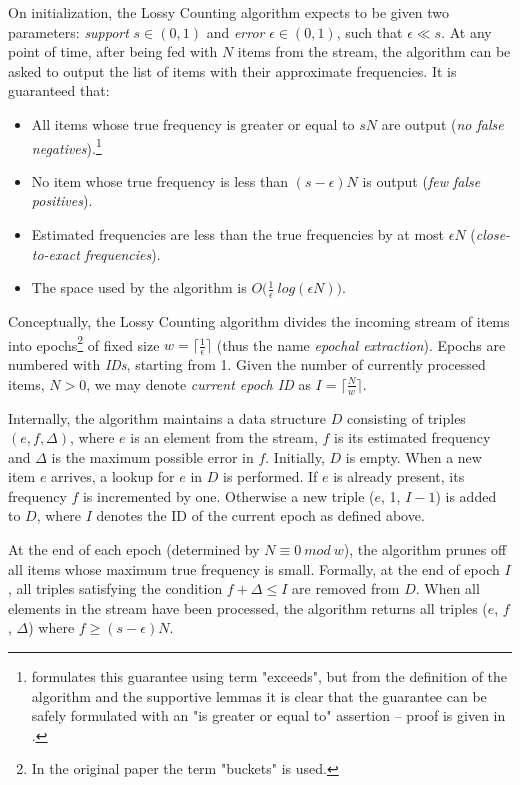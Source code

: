 On initialization, the Lossy Counting algorithm expects to be given two parameters:
\emph{support} $s \in (0,1)$ and \emph{error} $\epsilon \in (0,1)$, such
that $\epsilon \ll s$.
At any point of time, after being fed with $N$ items from the stream,
the algorithm can be asked to output the list of items with their approximate
frequencies. It is guaranteed that:
\begin{itemize}
 \item All items whose true frequency is greater or equal to $sN$ are output
  (\emph{no false negatives}).\footnote{\citet{manku:lossycounting} formulates this
    guarantee using term "exceeds", but from the definition of the algorithm and
    the supportive lemmas it is clear that the guarantee can be safely formulated with
    an "is greater or equal to" assertion -- proof is given in .}
 \item No item whose true frequency is less than $(s - \epsilon)N$ is output
  (\emph{few false positives}).
 \item Estimated frequencies are less than the true frequencies by at most
  $\epsilon N$ (\emph{close-to-exact frequencies}).
 \item The space used by the algorithm is $O\big(\frac{1}{\epsilon}~log(\epsilon N)\big)$.
\end{itemize}

Conceptually, the Lossy Counting algorithm divides the incoming stream of items
into epochs\footnote{In the original paper the term "buckets" is used.}
of fixed size $w = \lceil \frac{1}{\epsilon} \rceil$
(thus the name \emph{epochal extraction}).
Epochs are numbered with \emph{IDs}, starting from 1.
Given the number of currently processed items, $N > 0$, we may denote
\emph{current epoch ID} as $I = \lceil \frac{N}{w} \rceil$.

Internally, the algorithm maintains a data structure $D$ consisting of triples
$(e, f, \Delta)$, where $e$ is an element from the stream, $f$ is its estimated
frequency and $\Delta$ is the maximum possible error in $f$.
Initially, $D$ is empty.
When a new item $e$ arrives, a lookup for $e$ in $D$ is performed.
If $e$ is already present, its frequency $f$ is incremented by one.
Otherwise a new triple ($e$, 1, $I-1$) is added to $D$,
where $I$ denotes the ID of the current epoch as defined above.

At the end of each epoch (determined by $N \equiv 0~mod~w$), the algorithm
prunes off all items whose maximum true frequency is small.
Formally, at the end of epoch $I$, all triples satisfying the condition
$f + \Delta \leq I$ are removed from $D$.
When all elements in the stream have been processed, the algorithm returns all
triples ($e$, $f$, $\Delta$) where $f \geq (s-\epsilon)N$.

